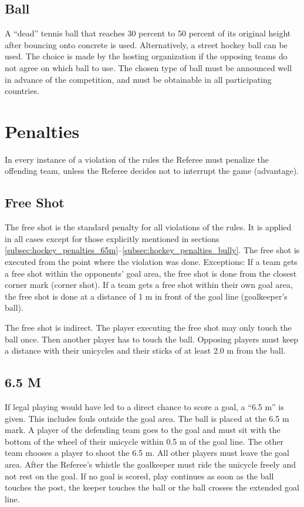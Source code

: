 \subsection{Ball}
A ``dead'' tennis ball that reaches 30 percent to 50 percent of its original height after bouncing onto concrete is used.
Alternatively, a street hockey ball can be used.
The choice is made by the hosting organization if the opposing teams do not agree on which ball to use.
The chosen type of ball must be announced well in advance of the competition, and must be obtainable in all participating countries.

\section{Penalties}
In every instance of a violation of the rules the Referee must penalize the offending team, unless the Referee decides not to interrupt the game (advantage).

\subsection{Free Shot}
The free shot is the standard penalty for all violations of the rules.
It is applied in all cases except for those explicitly mentioned in sections \ref{subsec:hockey_penalties_65m}–\ref{subsec:hockey_penalties_bully}.
The free shot is executed from the point where the violation was done.
Exceptions: If a team gets a free shot within the opponents' goal area, the free shot is done from the closest corner mark (corner shot).
If a team gets a free shot within their own goal area, the free shot is done at a distance of 1 m in front of the goal line (goalkeeper's ball).

The free shot is indirect.
The player executing the free shot may only touch the ball once.
Then another player has to touch the ball.
Opposing players must keep a distance with their unicycles and their sticks of at least 2.0 m from the ball.

\subsection{6.5 M \label{subsec:hockey_penalties_65m}}
If legal playing would have led to a direct chance to score a goal, a ``6.5 m'' is given.
This includes fouls outside the goal area.
The ball is placed at the 6.5 m mark.
A player of the defending team goes to the goal and must sit with the bottom of the wheel of their unicycle within 0.5 m of the goal line.
The other team chooses a player to shoot the 6.5 m.
All other players must leave the goal area.
After the Referee's whistle the goalkeeper must ride the unicycle freely and not rest on the goal.
If no goal is scored, play continues as soon as the ball touches the post, the keeper touches the ball or the ball crosses the extended goal line.

